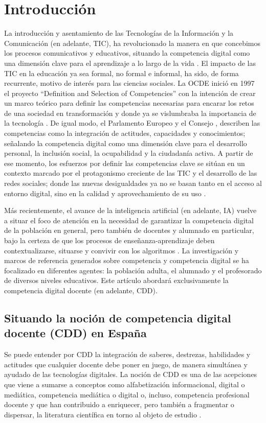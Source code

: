 \documentclass[spanish]{textolivre}
\begin{document}
\section{Introducción}\label{sec-1}
La introducción y asentamiento de las Tecnologías de la Información y la Comunicación (en adelante, TIC), ha revolucionado la manera en que concebimos los procesos comunicativos y educativos, situando la competencia digital como una dimensión clave para el aprendizaje a lo largo de la vida \cite{comisioneuropea2006}. El impacto de las TIC en la educación ya sea formal, no formal e informal, ha sido, de forma recurrente, motivo de interés para las ciencias sociales. La OCDE inició en 1997 el proyecto “Definition and Selection of Competencies” con la intención de crear un marco teórico para definir las competencias necesarias para encarar los retos de una sociedad en transformación y donde ya se vislumbraba la importancia de la tecnología  \cite{ocde2005}. De igual modo, el Parlamento Europeo y el Consejo \cite{comisioneuropea2006}, describen las competencias como la integración de actitudes, capacidades y conocimientos; señalando la competencia digital como una dimensión clave para el desarrollo personal, la inclusión social, la ocupabilidad y la ciudadanía activa. A partir de ese momento, los esfuerzos por definir las competencias clave se sitúan en un contexto marcado por el protagonismo creciente de las TIC y el desarrollo de las redes sociales; donde las nuevas desigualdades ya no se basan tanto en el acceso al entorno digital, sino en la calidad y aprovechamiento de su uso \cite{buckingham2020, medina2015}.

Más recientemente, el avance de la inteligencia artificial (en adelante, IA) vuelve a situar el foco de atención en la necesidad de garantizar la competencia digital de la población en general, pero también de docentes y alumnado en particular, bajo la certeza de que los procesos de enseñanza-aprendizaje deben contextualizarse, situarse y convivir con los algoritmos \cite{unesco2019}. La investigación y marcos de referencia generados sobre competencia y competencia digital se ha focalizado en diferentes agentes: la población adulta, el alumnado y el profesorado de diversos niveles educativos. Este artículo abordará exclusivamente la competencia digital docente (en adelante, CDD).

\subsection{Situando la noción de competencia digital docente (CDD) en España}\label{sec-1.1}
Se puede entender por CDD la integración de saberes, destrezas, habilidades y actitudes que cualquier docente debe poner en juego, de manera simultánea y ayudado de las tecnologías digitales. La noción de CDD es una de las acepciones que viene a sumarse a conceptos como alfabetización informacional, digital o mediática, competencia mediática o digital o, incluso, competencia profesional docente y que han contribuido a enriquecer, pero también a fragmentar o dispersar, la literatura científica en torno al objeto de estudio \cite{aguaded2022, area2012, gutierrez2012}.
\end{document}
